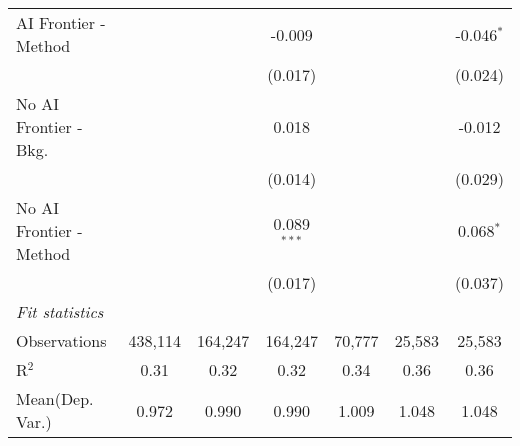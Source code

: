 \begin{tabular}{lcccccc}
   AI Frontier - Method    &               &               & -0.009        &               &               & -0.046$^{*}$\\   
                           &               &               & (0.017)       &               &               & (0.024)\\   
   No AI Frontier - Bkg.   &               &               & 0.018         &               &               & -0.012\\   
                           &               &               & (0.014)       &               &               & (0.029)\\   
   No AI Frontier - Method &               &               & 0.089$^{***}$ &               &               & 0.068$^{*}$\\   
                           &               &               & (0.017)       &               &               & (0.037)\\   
   \midrule
   \emph{Fit statistics}\\
   Observations            & 438,114       & 164,247       & 164,247       & 70,777        & 25,583        & 25,583\\  
   R$^2$                   & 0.31          & 0.32          & 0.32          & 0.34          & 0.36          & 0.36\\  
Mean(Dep. Var.) & 0.972 & 0.990 & 0.990 & 1.009 & 1.048 & 1.048 \\
   

\end{tabular}
